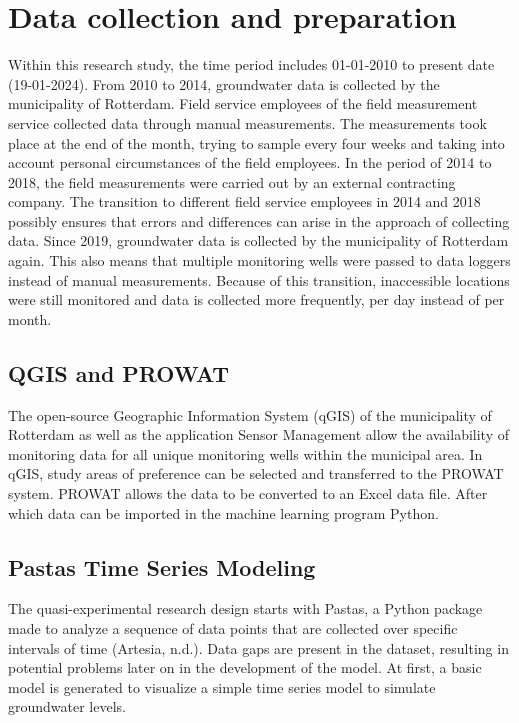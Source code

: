 \section{Data collection and preparation}
Within this research study, the time period includes 01-01-2010 to present date (19-01-2024). From 2010 to 2014, groundwater data is collected by the municipality of Rotterdam. Field service employees of the field measurement service collected data through manual measurements. The measurements took place at the end of the month, trying to sample every four weeks and taking into account personal circumstances of the field employees. In the period of 2014 to 2018, the field measurements were carried out by an external contracting company. The transition to different field service employees in 2014 and 2018 possibly ensures that errors and differences can arise in the approach of collecting data. Since 2019, groundwater data is collected by the municipality of Rotterdam again. This also means that multiple monitoring wells were passed to data loggers instead of manual measurements. Because of this transition, inaccessible locations were still monitored and data is collected more frequently, per day instead of per month.

\subsection{QGIS and PROWAT}
The open-source Geographic Information System (qGIS) of the municipality of Rotterdam as well as the application Sensor Management allow the availability of monitoring data for all unique monitoring wells within the municipal area. In qGIS, study areas of preference can be selected and transferred to the PROWAT system. PROWAT allows the data to be converted to an Excel data file. After which data can be imported in the machine learning program Python. 

\subsection{Pastas Time Series Modeling}
The quasi-experimental research design starts with Pastas, a Python package made to analyze a sequence of data points that are collected over specific intervals of time (Artesia, n.d.). Data gaps are present in the dataset,  resulting in potential problems later on in the development of the model. At first, a basic model is generated to visualize a simple time series model to simulate groundwater levels.

